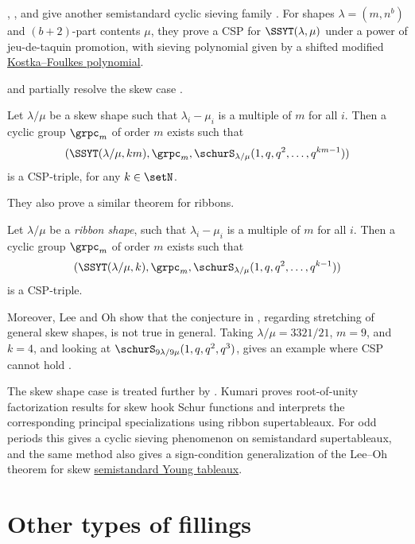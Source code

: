 , , and
 give another semistandard cyclic sieving family
\cite{BasmanMonterrubioHenricksonStokke2023x}.  For shapes
$\lambda=(m,n^b)$ and $(b+2)$-part contents $\mu$, they prove a CSP for
$\SSYT(\lambda,\mu)$ under a power of jeu-de-taquin promotion, with sieving
polynomial given by a shifted modified
\hyperref[modifiedKostkaFoulkesPolynomials]{Kostka--Foulkes polynomial}.

 and  partially resolve the
skew case \cite{LeeOh2022}.
\begin{theorem}[Lee--Oh, 2022]
Let $\lambda/\mu$ be a skew shape such that $\lambda_i - \mu_i$ is a multiple of $m$ for all $i$.
Then a cyclic group $\grpc_m$ of order $m$ exists such that
\[
(\SSYT(\lambda/\mu,km),\grpc_m,\schurS_{\lambda/\mu}(1,q,q^2,\dotsc,q^{km-1}))
\]
is a CSP-triple, for any $k \in \setN$.
\end{theorem}


They also prove a similar theorem for ribbons.
\begin{theorem}[Lee--Oh, 2022]
Let $\lambda/\mu$ be a \emph{ribbon shape}, such that $\lambda_i - \mu_i$ is a multiple of $m$ for all $i$.
Then a cyclic group $\grpc_m$ of order $m$ exists such that
\[
(\SSYT(\lambda/\mu,k),\grpc_m,\schurS_{\lambda/\mu}(1,q,q^2,\dotsc,q^{k-1}))
\]
is a CSP-triple.
\end{theorem}

Moreover, Lee and Oh show that the conjecture in
\cite{AlexanderssonAmini2018}, regarding stretching of general skew shapes, is
not true in general.  Taking $\lambda/\mu = 3321/21$, $m=9$, and $k=4$, and
looking at $\schurS_{9\lambda/9\mu}(1,q,q^2,q^3)$, gives an example where CSP
cannot hold \cite{LeeOh2022}.


The skew shape case is treated further by 
\cite{Kumari2022x}.  Kumari proves root-of-unity factorization results for
skew hook Schur functions and interprets the corresponding principal
specializations using ribbon supertableaux.  For odd periods this gives a
cyclic sieving phenomenon on semistandard supertableaux, and the same method
also gives a sign-condition generalization of the Lee--Oh theorem for skew
\hyperref[semistandardYoungTableau]{semistandard Young tableaux}.



\section[cspListMiscTableaux]{Other types of fillings}


